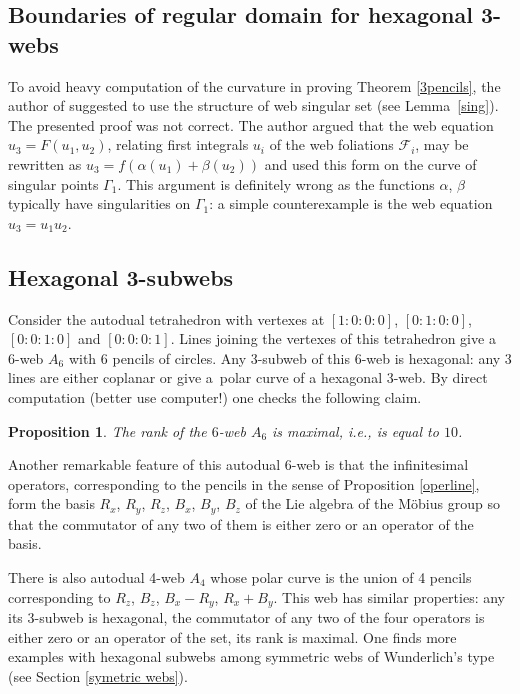 \documentclass[pdftex]{sigma}
\numberwithin{equation}{section}
\newtheorem{Proposition}[Theorem]{Proposition}
 { \theoremstyle{definition}
\newtheorem{Definition}[Theorem]{Definition}
\newtheorem{Note}[Theorem]{Note}
\newtheorem{Example}[Theorem]{Example}
\newtheorem{Remark}[Theorem]{Remark} }
\begin{document}
\subsection{Boundaries of regular domain for hexagonal 3-webs}

To avoid heavy computation of the curvature in proving Theorem \ref{3pencils}, the author of \cite{S-05} suggested to use the structure of web singular set (see Lemma~\ref{sing}). The presented proof was not correct. The author argued that the web equation $u_3=F(u_1,u_2)$, relating first integrals $u_i$ of the web foliations $\mathcal{F}_i$, may be rewritten as $u_3=f(\alpha(u_1)+\beta(u_2))$ and used this form on the curve of singular points $\Gamma_1$. This argument is definitely wrong as the functions $\alpha$, $\beta$ typically have singularities on $\Gamma_1$: a simple counterexample is the web equation $u_3=u_1u_2$.

\subsection{Hexagonal 3-subwebs}

Consider the autodual tetrahedron with vertexes at $[1:0:0:0]$, $[0:1:0:0]$, $[0:0:1:0]$ and $[0:0:0:1]$. Lines joining the vertexes of this tetrahedron give a 6-web $A_6$ with 6 pencils of circles. Any 3-subweb of this 6-web is hexagonal: any 3 lines are either coplanar or give a~polar curve of a hexagonal 3-web. By direct computation (better use computer!) one checks the following claim.
\begin{Proposition}
The rank of the $6$-web $A_6$ is maximal, i.e., is equal to $10$.
\end{Proposition}
Another remarkable feature of this autodual 6-web is that the infinitesimal operators, corresponding to the pencils in the sense of Proposition \ref{operline}, form the basis $R_x$, $R_y$, $R_z$, $B_x$, $B_y$, $B_z$ of the Lie algebra of the M\"obius group so that the commutator of any two of them is either zero or an operator of the basis.

There is also autodual 4-web $A_4$ whose polar curve is the union of 4 pencils corresponding to $R_z$, $B_z$, $B_x-R_y$, $R_x+B_y$. This web has similar properties: any its 3-subweb is hexagonal, the commutator of any two of the four operators is either zero or an operator of the set, its rank is maximal.
One finds more examples with hexagonal subwebs among symmetric webs of Wunderlich's type (see Section \ref{symetric webs}).
\end{document}
